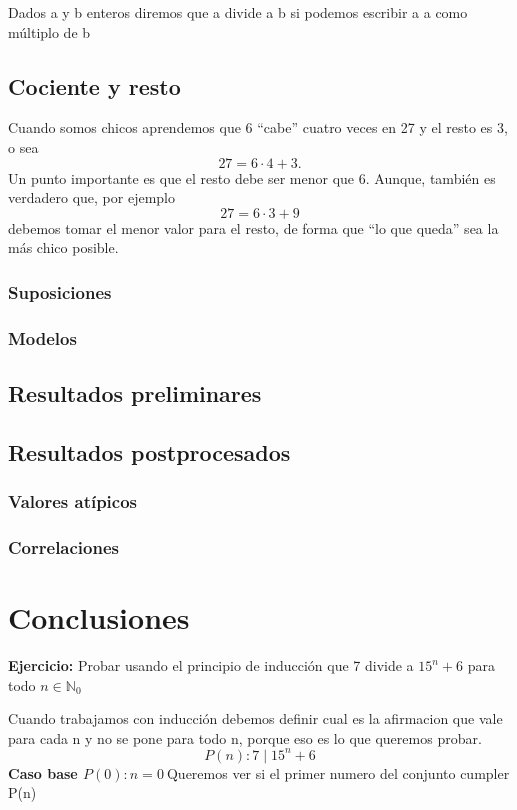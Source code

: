 \documentclass[12pt]{book}
\begin{document}
Dados a y b enteros diremos que a divide a b si podemos escribir a a como múltiplo de b

\section{Cociente y resto}
Cuando somos chicos aprendemos que 6 “cabe” cuatro veces en 27 y el resto es 3, o sea
\[ 27 = 6 \cdot 4 + 3. \]
Un punto importante es que el resto debe ser menor que 6. Aunque, también es verdadero que,
por ejemplo
\[27 = 6 \cdot 3 + 9\]
debemos tomar el menor valor para el resto, de forma que “lo que queda” sea la más chico posible.

\subsection{Suposiciones}
\subsection{Modelos}
\section{Resultados preliminares}
\section{Resultados postprocesados}
\subsection{Valores atípicos}
\subsection{Correlaciones}
\chapter{Conclusiones}





\begin{shaded}
\textbf{Ejercicio:} Probar usando el principio de inducción que 7 divide a $ 15^{n} + 6$ para todo $n \in \mathbb N_{0}$  
\end{shaded}

Cuando trabajamos con inducci\'on debemos definir cual es la afirmacion que vale para cada n   y no se pone para todo n, porque eso es lo que queremos probar.\\
\[
 P(n): 7 \mid 15^{n} + 6
\]
\newline
\textbf{Caso base $P(0): n = 0  \ $}\quad Queremos ver si el primer numero del conjunto cumpler P(n)
\end{document}
